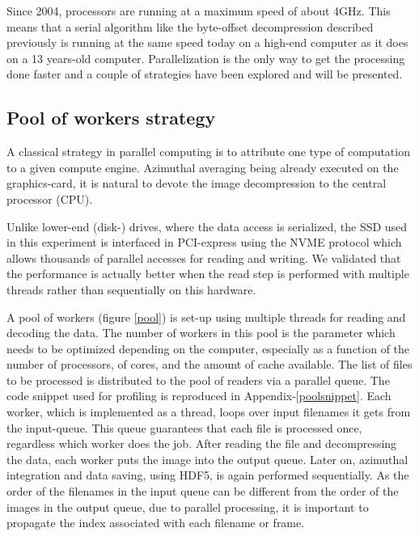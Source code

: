 \documentclass[preprint]{iucr}              %
\begin{document}
Since 2004, processors are running at a maximum speed of about 4GHz.
This means that a serial algorithm like the byte-offset decompression described
previously is running at the same speed today on a high-end computer as it
does on a 13 years-old computer.
Parallelization is the only way to get the processing done faster and a couple
of strategies have been explored and will be presented.

\subsection{Pool of workers strategy} 

A classical strategy in parallel computing is to attribute one type of
computation to a given compute engine.
Azimuthal averaging being already executed on the graphics-card, it is natural
to devote the image decompression to the central processor (CPU).

Unlike lower-end (disk-) drives, where the data access is serialized,
the SSD used in this experiment is interfaced in PCI-express using the NVME
protocol \cite{nvme} which allows thousands of parallel accesses for reading and
writing.
We validated that the performance is actually better when the read step is
performed with multiple threads rather than sequentially on this hardware.

A pool of workers (figure \ref{pool}) is set-up using multiple threads for
reading and decoding the data.  
The number of workers in this pool is the parameter which needs to be
optimized depending on the computer, especially as a function of the
number of processors, of cores, and the amount of cache available.
The list of files to be processed is distributed to the pool of readers via
a parallel queue.
The code snippet used for profiling is reproduced in Appendix-\ref{poolsnippet}.
Each worker, which is implemented as a thread, loops over input filenames it gets 
from the input-queue.
This queue guarantees that each file is processed once, regardless which worker 
does the job.
After reading the file and decompressing the data, each worker puts the image
into the output queue.
Later on, azimuthal integration and data saving, using HDF5, is again performed
sequentially. 
As the order of the filenames in the input queue can be different from the order
of the images in the output queue, due to parallel processing, it is important
to propagate the index associated with each filename or frame.
\end{document}
